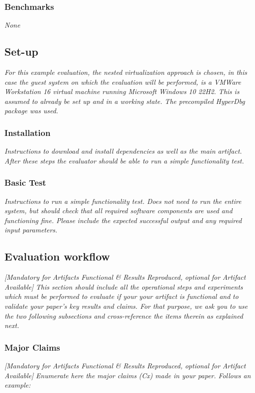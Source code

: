 \subsubsection{Benchmarks}
\textit{None}

\subsection{Set-up}

\textit{For this example evaluation, the nested virtualization approach is chosen, in this case the guest system on which the evaluation will be performed,
is a VMWare Workstation 16 virtual machine running Microsoft Windows 10 22H2. This is assumed to already be set up and in a working state. The precompiled HyperDbg package was used.}

\subsubsection{Installation}
\textit{Instructions to download and install dependencies as
well as the main artifact. After these steps the evaluator should be able to run
a simple functionality test.}

\subsubsection{Basic Test}
\textit{Instructions to run a simple functionality test. Does
not need to run the entire system, but should check that all required software
components are used and functioning fine. Please include the expected successful
output and any required input parameters.}

\subsection{Evaluation workflow}
{\em [Mandatory for Artifacts Functional \& Results Reproduced, optional for
Artifact Available]} \textit{This section should include all the operational
steps and experiments which must be performed to evaluate if your your artifact is
functional and to validate your paper's key results and claims. For that
purpose, we ask you to use the two following subsections and cross-reference the
items therein as explained next.}

\subsubsection{Major Claims}
{\em [Mandatory for Artifacts Functional \& Results Reproduced, optional for
Artifact Available]} \textit{Enumerate here the major claims (Cx) made in your
paper. Follows an example:}\\

